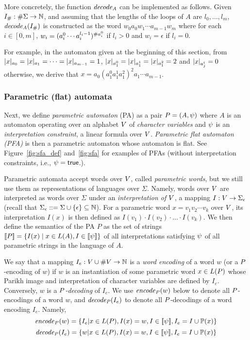 \documentclass[sigplan,screen]{acmart}
\begin{document}
 More concretely, the function $\mathit{decode_{A}}$ can be implemented as follows. 
Given $I_{\#}:\#\Sigma\rightarrow\mathbb{N}$,
and assuming that the lengths of the loops of $A$ are $l_0,\ldots,l_{m}$, 
$\mathit{decode_{A}}(I_{\#})$ is constructed as the word $w_0 a_{0} w_1 \cdots a_{m-1} w_{m}$ where for each $i\in [0,m]$,
$w_i = (a_i^0 \cdots a_i^{l_{i}-1})^{\#{a_i^0}}$ if $l_i >0$ and $w_i = \epsilon$ if $l_i = 0$. 

For example, in the automaton given at the beginning of this section, 
from $|x|_{a_0} = |x|_{a_1} = \cdots = |x|_{a_{m-1}}=1$, $|x|_{a^0_1}=|x|_{a^1_1}=|x|_{a^2_1}=2$ and $|x|_{a^i_j}=0$ otherwise,  we derive that $x=a_0(a^0_1a^1_1a^2_1)^2a_1\cdots a_{m-1}$. 

\subsubsection*{Parametric (flat) automata}
Next, we define \emph{parametric automaton} (PA) as a pair  $P = (A,\psi)$ where 
$A$ is an automaton operating over an alphabet $V$ of \emph{character variables}  
and $\psi$ is an \emph{interpretation constraint}, a linear formula over $V$. 
\emph{Parametric flat automaton (PFA)} is then a parametric automaton whose  automaton is flat. See Figure~\ref{fig:sfa_def} and~\ref{fig:sfa} for examples of PFAs (without interpretation constraints, i.e., $\psi = \mbox{$\mathsf{true}$}$.).

Parametric automata accept words over $V$, called \emph{parametric words}, but we still use them as representations of languages over $\Sigma$. 
%
Namely, words over $V$ are interpreted as words over $\Sigma$ under an
\emph{interpretation of $V$},
%
a mapping $I:V\rightarrow\Sigma_\epsilon$ (recall that $\Sigma_\epsilon::= \Sigma \cup \{\epsilon\} \subseteq \mathbb{N}$). 
For a parametric word $x= v_1v_2\cdots v_k$ over $V$, its interpretation $I(x)$ is then defined as $I(v_1)\cdot I(v_2)\cdot \ldots \cdot I(v_k)$.
We then define the semantics of the PA $P$ as the set of strings   
$[\![P]\!] = \{I(x) \mid x\in L(A),I\in[\![\psi]\!]\}$ of all interpretations satisfying $\psi$ of all parametric strings in the language of $A$. 

We say that a mapping $I_e:V\cup\#V \rightarrow \mathbb{N}$ is a \emph{word encoding} of a word $w$  (or a $P$-encoding of $w$) if $w$ is an instantiation of some parametric word $x \in L(P)$ whose Parikh image and interpretation of character variables are defined by $I_e$.  
%
Conversely, $w$ is a \emph{$P$-decoding} of $I_e$.
%
We use $\mathit{encode}_{P}(w)$ below to denote all $P$-encodings of a word $w$,
and $\mathit{decode_{P}} (I_e)$ to denote all $P$-decodings of a word encoding $I_e$. Namely,  
	$$\mathit{encode}_{P}(w)=\{I_e |  x \in L(P), I(x) =w, I\in[\![\psi]\!], I_e = I \cup \mathbb{P}{(x)}\}$$
	$$\mathit{decode_{P}}(I_e)=\{ w | x \in L(P), I(x) =w, I\in[\![\psi]\!], I_e = I \cup \mathbb{P}{(x)} \}$$
\end{document}
